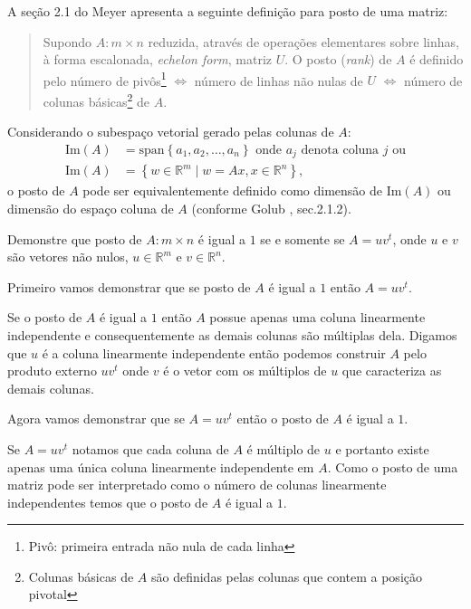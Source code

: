 \documentclass[a4paper,12pt, leqno, answers]{exam}
\begin{document}
\begin{questions}
     A se\c{c}\~{a}o 2.1 do Meyer\nocite{Meyer:2000:matrix} apresenta a seguinte defini\c{c}\~{a}o para posto de uma matriz:
    \begin{quote}
        Supondo $A : m \times n$ reduzida, atrav\'{e}s de opera\c{c}\~{o}es elementares sobre linhas, \`{a} forma escalonada, \textit{echelon form}, matriz $U$. O posto (\textit{rank}) de $A$ \'{e} definido pelo n\'{u}mero de piv\^{o}s\footnote{Piv\^{o}: primeira entrada n\~{a}o nula de cada linha} $\Leftrightarrow$ n\'{u}mero de linhas n\~{a}o nulas de $U$ $\Leftrightarrow$ n\'{u}mero de colunas b\'{a}sicas\footnote{Colunas b\'{a}sicas de $A$ s\~{a}o definidas pelas colunas que contem a posi\c{c}\~{a}o pivotal} de $A$.
    \end{quote}

    Considerando o subespa\c{c}o vetorial gerado pelas colunas de $A$:
    \begin{align*}
        \mbox{Im} (A) &= \mbox{span} \left\{ a_1, a_2, \ldots, a_n \right\} \mbox{ onde $a_j$ denota coluna $j$ ou} \\
        \mbox{Im} (A) &= \left\{ w \in \mathbb{R}^m \mid w = A x, x \in \mathbb{R}^n \right\},
    \end{align*}
    o posto de $A$ pode ser equivalentemente definido como dimens\~{a}o de $\mbox{Im} (A)$ ou dimens\~{a}o do espa\c{c}o coluna de $A$ (conforme Golub\nocite{Golub:1996:matrix} , sec.2.1.2).

     Demonstre que posto de $A : m \times n$ \'{e} igual a $1$ se e somente se $A = u v^t$, onde $u$ e $v$ s\~{a}o vetores n\~{a}o nulos, $u \in \mathbb{R}^m$ e $v \in \mathbb{R}^n$.
    \begin{solution}
        Primeiro vamos demonstrar que se posto de $A$ \'{e} igual a $1$ ent\~{a}o $A = u v^t$.
        
        Se o posto de $A$ \'{e} igual a $1$ ent\~{a}o $A$ possue apenas uma coluna linearmente independente e consequentemente as demais colunas s\~{a}o m\'{u}ltiplas dela. Digamos que $u$ \'{e} a coluna linearmente independente ent\~{a}o podemos construir $A$ pelo produto externo $u v^t$ onde $v$ \'{e} o vetor com os m\'{u}ltiplos de $u$ que caracteriza as demais colunas.

        Agora vamos demonstrar que se $A = u v^t$ ent\~{a}o o posto de $A$ \'{e} igual a $1$. 

        Se $A = u v^t$ notamos que cada coluna de $A$ \'{e} m\'{u}ltiplo de $u$ e portanto existe apenas uma \'{u}nica coluna linearmente independente em $A$. Como o posto de uma matriz pode ser interpretado como o n\'{u}mero de colunas linearmente independentes temos que o posto de $A$ \'{e} igual a $1$.
    \end{solution}


\end{questions}
\end{document}
